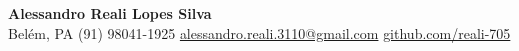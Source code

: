 \begin{center}
    {\Huge \bfseries Alessandro Reali Lopes Silva} \\ [5pt]
    \small
    \faMapMarker* \space Belém, PA \quad
    \faPhone \space (91) 98041-1925 \quad
    \faEnvelope \space \href{mailto:alessandro.reali.3110@gmail.com}{alessandro.reali.3110@gmail.com} \quad
    \faGithub \space \href{https://github.com/reali-705}{github.com/reali-705}
\end{center}